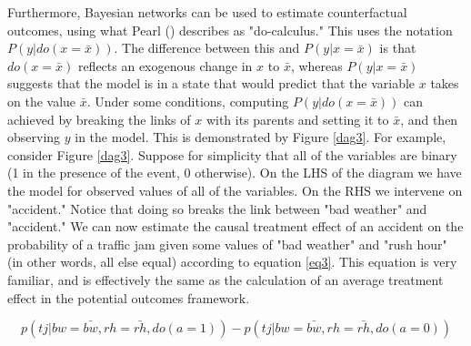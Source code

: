 \documentclass{article}
\begin{document}
Furthermore, Bayesian networks can be used to estimate counterfactual outcomes, using what Pearl (\citeyear{pearl2014probabilistic}) describes as "do-calculus." This uses the notation $P(y|do(x=\bar{x}))$. The difference between this and $P(y|x=\bar{x})$ is that $do(x=\bar{x})$ reflects an exogenous change in $x$ to $\bar{x}$, whereas $P(y|x=\bar{x})$ suggests that the model is in a state that would predict that the variable $x$ takes on the value $\bar{x}$. Under some conditions, computing $P(y|do(x=\bar{x}))$ can achieved by breaking the links of $x$ with its parents and setting it to $\bar{x}$, and then observing $y$ in the model. This is demonstrated by Figure \ref{dag3}. For example, consider Figure \ref{dag3}. Suppose for simplicity that all of the variables are binary (1 in the presence of the event, 0 otherwise). On the LHS of the diagram we have the model for observed values of all of the variables. On the RHS we intervene on "accident." Notice that doing so breaks the link between "bad weather" and "accident." We can now estimate the causal treatment effect of an accident on the probability of a traffic jam given some values of "bad weather" and "rush hour" (in other words, all else equal) according to equation \ref{eq3}. This equation is very familiar, and is effectively the same as the calculation of an average treatment effect in the potential outcomes framework.

\begin{equation}
  \label{eq3}
  p(tj | bw = \bar{bw}, rh = \bar{rh}, do(a=1)) - p(tj | bw = \bar{bw}, rh = \bar{rh}, do(a=0))
\end{equation}
\end{document}
